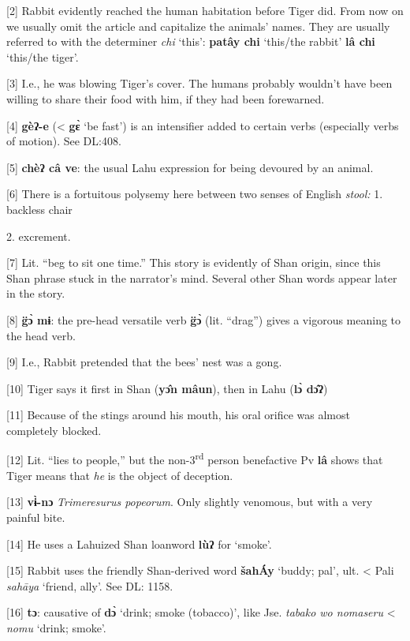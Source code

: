 {[2] Rabbit evidently reached the human habitation before Tiger did. From
now on we usually omit the article and capitalize the animals' names. They are
usually referred to with the determiner }{\textit{chi}}{ `this':
}{\textbf{patây chi}}{ `this/the rabbit'}{\textbf{ lâ chi}}{
`this/the tiger'.}

{[3] I.e., he was blowing Tiger's cover. The humans probably wouldn't have
been willing to share their food with him, if they had been forewarned.}

{[4]}{\textbf{ gèʔ-e }}{(< }{\textbf{gɛ̀}}{
`be fast') is an intensifier added to certain verbs (especially verbs of motion).
See DL:408.
}

{[5] }{\textbf{chèʔ câ ve}}{: the usual Lahu expression
for being devoured by an animal.}

{[6] There is a fortuitous polysemy here between two senses of  English
}{\textit{stool: }}{1. backless chair      }

{2. excrement.}

{[7] Lit. ``beg to sit one time.'' This story is evidently of Shan origin,
since this Shan phrase stuck in the narrator's mind. Several other Shan words appear
later in the story.}

{[8]}{\textbf{  g̈ɔ̀ mɨ}}{: the pre-head versatile verb
}{\textbf{g̈ɔ̀}}{ (lit. ``drag'') gives a vigorous meaning to
the head verb.}

{[9] I.e., Rabbit pretended that the bees' nest was a gong.}

{[10] Tiger says it first in Shan (}{\textbf{yɔ̂n mâun}}{),
then in Lahu (}{\textbf{lɔ̀ dɔ̂ʔ}}{)}

{[11] Because of the stings around his mouth, his oral orifice was almost
completely blocked.}

{[12] Lit. ``lies to people,'' but the non-3}{\textsuperscript{rd}}{
person benefactive Pv }{\textbf{lâ}}{ shows that Tiger means that
}{\textit{he}}{ is the object of deception.}

{[13]}{\textbf{ vɨ̀-nɔ }}{\textit{Trimeresurus popeorum}}{.
Only slightly venomous, but with a very painful bite.}

{[14] He uses a Lahuized Shan loanword }{\textbf{lùʔ}}{
for `smoke'.}

{[15] Rabbit uses the friendly Shan-derived word }{\textbf{šahÁy}}{
`buddy; pal', ult.  < Pali }{\textit{sahāya }}{`friend,
ally'. See DL: 1158.}

{[16] }{\textbf{ tɔ}}{: causative of }{\textbf{dɔ̀
}}{`drink; smoke (tobacco)', like Jse. }{\textit{tabako wo nomaseru
}}{< }{\textit{nomu}}{ `drink; smoke'.}

